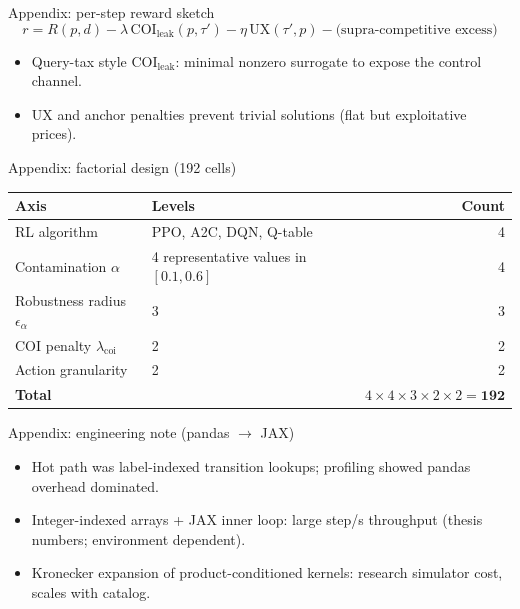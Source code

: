 \begin{frame}{Appendix: per-step reward sketch}
  \small
  \[
    r = R(p,d) - \lambda\,\mathrm{COI}_{\mathrm{leak}}(p,\tau') - \eta\,\mathrm{UX}(\tau',p) - \text{(supra-competitive excess)}
  \]
  \begin{itemize}
    \item Query-tax style \(\mathrm{COI}_{\mathrm{leak}}\): minimal nonzero surrogate to expose the control channel.
    \item UX and anchor penalties prevent trivial solutions (flat but exploitative prices).
  \end{itemize}
\end{frame}

\begin{frame}{Appendix: factorial design (192 cells)}
  \footnotesize
  \centering
  \begin{tabular}{@{}llr@{}}
    \toprule
    Axis & Levels & Count \\
    \midrule
    RL algorithm & PPO, A2C, DQN, Q-table & 4 \\
    Contamination \(\alpha\) & 4 representative values in \([0.1,0.6]\) & 4 \\
    Robustness radius \(\epsilon_\alpha\) & 3 & 3 \\
    COI penalty \(\lambda_{\mathrm{coi}}\) & 2 & 2 \\
    Action granularity & 2 & 2 \\
    \midrule
    \textbf{Total} & & \(4\times4\times3\times2\times2=\mathbf{192}\) \\
    \bottomrule
  \end{tabular}
\end{frame}

\begin{frame}{Appendix: engineering note (pandas \(\to\) JAX)}
  \begin{itemize}
    \item Hot path was label-indexed transition lookups; profiling showed pandas overhead dominated.
    \item Integer-indexed arrays + JAX inner loop: large step/s throughput (thesis numbers; environment dependent).
    \item Kronecker expansion of product-conditioned kernels: research simulator cost, scales with catalog.
  \end{itemize}
\end{frame}


